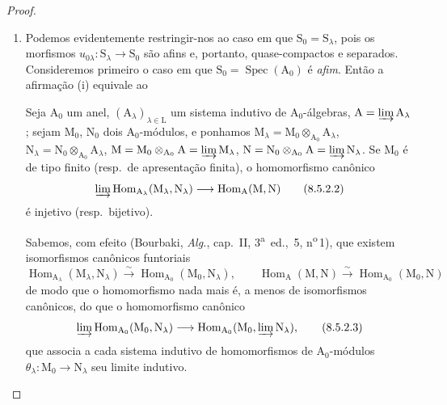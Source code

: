 \begin{proof}
\begin{enumerate}[label=(\roman*)]
  \item Podemos evidentemente restringir-nos ao caso em que $\mathrm{S}_0=\mathrm{S}_\lambda$, pois os morfismos $u_{0\lambda}:\mathrm{S}_\lambda\to\mathrm{S}_0$ são afins e, portanto, quase-compactos e separados.
Consideremos primeiro o caso em que $\mathrm{S}_0=\operatorname{Spec}(\mathrm{A}_0)$ é \emph{afim}.
Então a afirmação (i) equivale ao

\begin{lemma}[8.5.2.1]
\label{IV.8.5.2.1}
Seja $\mathrm{A}_0$ um anel, $(\mathrm{A}_\lambda)_{\lambda\in\mathrm{L}}$ um sistema indutivo de $\mathrm{A}_0$-álgebras, $\mathrm{A}=\varinjlim\mathrm{A}_\lambda$; sejam $\mathrm{M}_0$, $\mathrm{N}_0$ dois $\mathrm{A}_0$-módulos, e ponhamos $\mathrm{M}_\lambda=\mathrm{M}_0\otimes_{\mathrm{A}_0}\mathrm{A}_\lambda$, $\mathrm{N}_\lambda=\mathrm{N}_0\otimes_{\mathrm{A}_0}\mathrm{A}_\lambda$, $\mathrm{M}=\mathrm{M}_0\otimes_{\mathrm{A}_0}\mathrm{A}=\varinjlim\mathrm{M}_\lambda$, $\mathrm{N}=\mathrm{N}_0\otimes_{\mathrm{A}_0}\mathrm{A}=\varinjlim\mathrm{N}_\lambda$.
Se $\mathrm{M}_0$ é de tipo finito (resp.\ de apresentação finita), o homomorfismo canônico
\begin{equation}
  \varinjlim\operatorname{Hom}_{\mathrm{A}_\lambda}(\mathrm{M}_\lambda,\mathrm{N}_\lambda)\to\operatorname{Hom}_\mathrm{A}(\mathrm{M},\mathrm{N})
  \tag{8.5.2.2}
\label{IV.8.5.2.2}
\end{equation}
é injetivo (resp.\ bijetivo).
\end{lemma}

Sabemos, com efeito (Bourbaki, \emph{Alg.}, cap.~II, 3\textsuperscript{a}~ed., \textsection\,5, n\textsuperscript{o}\,1), que existem isomorfismos canônicos funtoriais
\[
  \operatorname{Hom}_{\mathrm{A}_\lambda}(\mathrm{M}_\lambda,\mathrm{N}_\lambda)\xrightarrow{\sim}\operatorname{Hom}_{\mathrm{A}_0}(\mathrm{M}_0,\mathrm{N}_\lambda),\qquad\operatorname{Hom}_\mathrm{A}(\mathrm{M},\mathrm{N})\xrightarrow{\sim}\operatorname{Hom}_{\mathrm{A}_0}(\mathrm{M}_0,\mathrm{N})
\]
de modo que o homomorfismo  nada mais é, a menos de isomorfismos canônicos, do que o homomorfismo canônico
\begin{equation}
  \varinjlim\operatorname{Hom}_{\mathrm{A}_0}(\mathrm{M}_0,\mathrm{N}_\lambda)\to\operatorname{Hom}_{\mathrm{A}_0}(\mathrm{M}_0,\varinjlim\mathrm{N}_\lambda),
  \tag{8.5.2.3}
\label{IV.8.5.2.3}
\end{equation}
que associa a cada sistema indutivo de homomorfismos de $\mathrm{A}_0$-módulos $\theta_\lambda:\mathrm{M}_0\to\mathrm{N}_\lambda$ seu limite indutivo.


\end{enumerate}
\end{proof}
